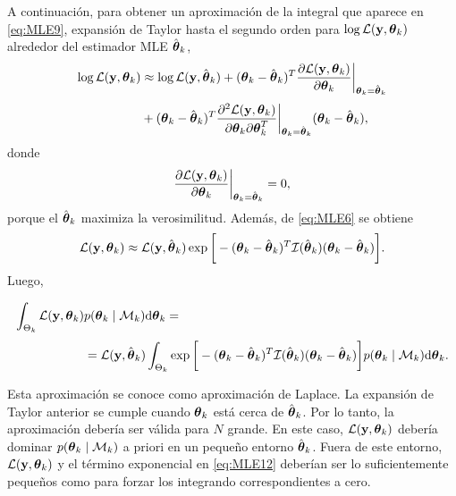 A continuación, para obtener un aproximación de la integral que aparece en \eqref{eq:MLE9}, expansión de  Taylor hasta el segundo orden para $\log \mathcal{L}(\mathbf{y}, \boldsymbol{\theta}_k)$ alrededor del estimador MLE $\hat{\boldsymbol{\theta}}_k$, 
\begin{equation}
	\begin{aligned}
		\log\mathcal{L}(\mathbf{y}, \boldsymbol{\theta}_k) & \approx \log\mathcal{L}(\mathbf{y},\hat{\boldsymbol{\theta}}_k) + (\boldsymbol{\theta}_k-\hat{\boldsymbol{\theta}}_k)^T\frac{\partial\mathcal{L}(\mathbf{y},\boldsymbol{\theta}_k)}{\partial\boldsymbol{\theta}_k}\bigg|_{\boldsymbol{\theta}_k=\hat{\boldsymbol{\theta}}_k}\\[0.3em]
		& + (\boldsymbol{\theta}_k-\hat{\boldsymbol{\theta}}_k)^T\frac{\partial^2\mathcal{L}(\mathbf{y},\boldsymbol{\theta}_k)}{\partial\boldsymbol{\theta}_k\partial\boldsymbol{\theta}_k^T}\bigg|_{\boldsymbol{\theta}_k=\hat{\boldsymbol{\theta}}_k}(\boldsymbol{\theta}_k-\hat{\boldsymbol{\theta}}_k),
	\end{aligned}
	\label{eq:MLE10}
\end{equation}  
donde \[\frac{\partial\mathcal{L}(\mathbf{y},\boldsymbol{\theta}_k)}{\partial\boldsymbol{\theta}_k}\bigg|_{\boldsymbol{\theta}_k=\hat{\boldsymbol{\theta}}_k} = 0,\]
porque el $\hat{\boldsymbol{\theta}}_k$ maximiza la verosimilitud. Además, de \eqref{eq:MLE6} se obtiene
\begin{equation}
	\mathcal{L}(\mathbf{y},\boldsymbol{\theta}_k)\approx \mathcal{L}(\mathbf{y}, \hat{\boldsymbol{\theta}}_k)\exp\bigg[-(\boldsymbol{\theta}_k-\hat{\boldsymbol{\theta}}_k)^T\mathcal{I}(\hat{\boldsymbol{\theta}}_k)(\boldsymbol{\theta}_k-\hat{\boldsymbol{\theta}}_k)\bigg].
	\label{eq:MLE11}
\end{equation}
Luego,

\begin{equation}
	\begin{aligned}
	\int_{\Theta_k}\mathcal{L}(\mathbf{y}, \boldsymbol{\theta}_k)& p(\boldsymbol{\theta}_k\mid\mathcal{M}_k)\mathrm{d}\boldsymbol{\theta}_k  =\\[0.3em] & = \mathcal{L}(\mathbf{y}, \hat{\boldsymbol{\theta}}_k)\int_{\Theta_k}\exp\bigg[-(\boldsymbol{\theta}_k-\hat{\boldsymbol{\theta}}_k)^T\mathcal{I}(\hat{\boldsymbol{\theta}}_k)(\boldsymbol{\theta}_k-\hat{\boldsymbol{\theta}}_k)\bigg]p(\boldsymbol{\theta}_k\mid\mathcal{M}_k)\mathrm{d}\boldsymbol{\theta}_k.
	\end{aligned} 
	\label{eq:MLE12}
\end{equation}

Esta aproximación se conoce como aproximación de Laplace. La expansión de Taylor anterior se cumple cuando $\boldsymbol{\theta}_k$ está cerca de $\hat{\boldsymbol{\theta}}_k$. Por lo tanto, la aproximación debería ser válida para $N$ grande. En este caso, $\mathcal{L}(\mathbf{y},\boldsymbol{\theta}_k)$ debería dominar $p(\boldsymbol{\theta}_k\mid\mathcal{M}_k)$ a priori en un pequeño entorno $\hat{\boldsymbol{\theta}}_k$. Fuera de este entorno, $\mathcal{L}(\mathbf{y},\boldsymbol{\theta}_k)$ y el término exponencial en \eqref{eq:MLE12} deberían ser lo suficientemente pequeños como para forzar los integrando correspondientes a cero. 


